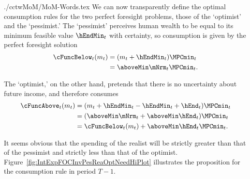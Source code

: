 \documentclass[titlepage, headings=optiontotocandhead]{\econtex}
\begin{document}
\begin{verbatimwrite}{./cctwMoM/MoM-Words.tex}
  We can now transparently define the optimal
  consumption rules for the two perfect foresight problems, those of the
  `optimist' and the `pessimist.'  The `pessimist' perceives human
  wealth to be equal to its minimum feasible value $\hEndMin_{t}$ with certainty, so 
  consumption is given by the perfect foresight solution
  \begin{equation*}\begin{gathered}\begin{aligned}
        \cFuncBelow_{t}(m_{t})  & = ({m}_{t}+\hEndMin_{t})\MPCmin_{t}
        \\  & = \aboveMin \mNrm_{t}\MPCmin_{t}
        .
      \end{aligned}\end{gathered}\end{equation*}

  The `optimist,' on the other hand, pretends that there is no uncertainty
  about future income, and therefore consumes
  \begin{equation*}\begin{gathered}\begin{aligned}
        \cFuncAbove_{t}(m_{t})  & = ({m}_{t} +\hEndMin_{t} - \hEndMin_{t} + \hEnd_{t} )\MPCmin_{t}
        \\    & = (\aboveMin \mNrm_{t} + \aboveMin \hEnd_{t})\MPCmin_{t}
        \\      & = \cFuncBelow_{t}(m_{t})+\aboveMin \hEnd_{t} \MPCmin_{t}
        .
      \end{aligned}\end{gathered}\end{equation*}

  It seems obvious that the spending of the realist will be strictly greater
  than that of the pessimist and strictly less than that of the
  optimist.  Figure~\ref{fig:IntExpFOCInvPesReaOptNeedHiPlot} illustrates the proposition for the consumption rule in period $T-1$.  
\end{verbatimwrite}
\unskip
\end{document}
